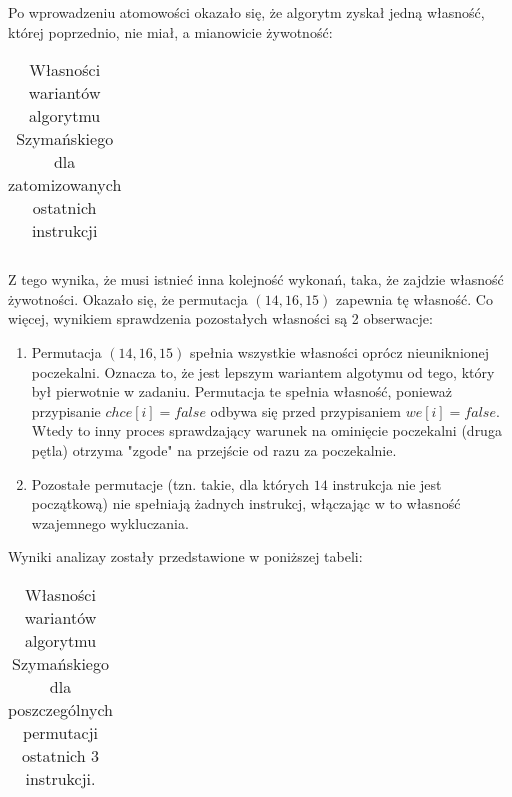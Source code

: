 \documentclass[oneside]{book}
\begin{document}
Po wprowadzeniu atomowości okazało się, że algorytm zyskał jedną własność, której poprzednio, nie miał, a mianowicie żywotność:

\begin{table}[H]                                                                                                                                                             
\centering
  \begin{tabular}{| l |r |}                                                      
   \hline                                                                             \hline
   \end{tabular}                                                                
  \caption{Własności wariantów algorytmu Szymańskiego dla zatomizowanych ostatnich instrukcji}                 
 \end{table} 
 
Z tego wynika, że musi istnieć inna kolejność wykonań, taka, że zajdzie własność żywotności. Okazało się, że permutacja $(14,16,15)$ zapewnia tę własność. Co więcej, wynikiem sprawdzenia pozostałych własności są 2 obserwacje:
\begin{enumerate}
\item Permutacja $(14,16,15)$ spełnia wszystkie własności oprócz nieuniknionej
poczekalni. Oznacza to, że jest lepszym wariantem algotymu od tego, który był
pierwotnie w zadaniu. Permutacja te spełnia własność, ponieważ przypisanie $chce[i] = false$ odbywa się przed przypisaniem $we[i] = false$. Wtedy to inny proces sprawdzający warunek na ominięcie poczekalni (druga pętla) otrzyma "zgode" na przejście od razu za poczekalnie.
\item Pozostałe permutacje (tzn. takie, dla których $14$ instrukcja nie jest początkową) nie spełniają żadnych instrukcj, włączając w to własność wzajemnego wykluczania.
\end{enumerate}

Wyniki analizay zostały przedstawione w poniższej tabeli:

\begin{table}[H]                                                                                                                                                             
\centering
  \begin{tabularx}{\textwidth}{| l | R | R | R | R | R | R |}                                                      
   \hline                                                                             \hline
   \end{tabularx}                                                                
  \caption{Własności wariantów algorytmu Szymańskiego dla poszczególnych permutacji ostatnich $3$ instrukcji.}                 
 \end{table} 
\end{document}
